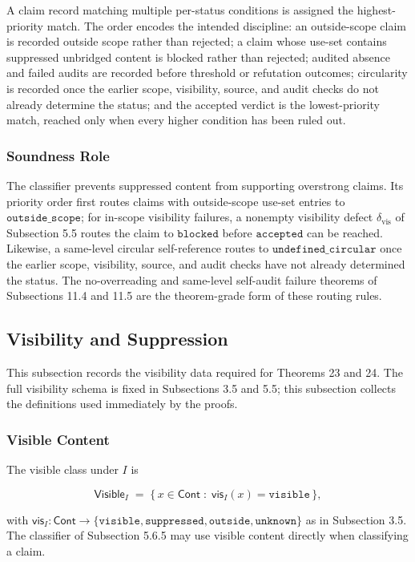 \documentclass[11pt]{article}
\theoremstyle{definition}
\begin{document}
A claim record matching multiple per-status conditions is assigned the highest-priority match. The order encodes the intended discipline: an outside-scope claim is recorded outside scope rather than rejected; a claim whose use-set contains suppressed unbridged content is blocked rather than rejected; audited absence and failed audits are recorded before threshold or refutation outcomes; circularity is recorded once the earlier scope, visibility, source, and audit checks do not already determine the status; and the accepted verdict is the lowest-priority match, reached only when every higher condition has been ruled out.

\subsubsection{Soundness Role}

The classifier prevents suppressed content from supporting overstrong claims. Its priority order first routes claims with outside-scope use-set entries to \(\texttt{outside\_scope}\); for in-scope visibility failures, a nonempty visibility defect \(\delta_{\mathrm{vis}}\) of Subsection 5.5 routes the claim to \(\texttt{blocked}\) before \(\texttt{accepted}\) can be reached. Likewise, a same-level circular self-reference routes to \(\texttt{undefined\_circular}\) once the earlier scope, visibility, source, and audit checks have not already determined the status. The no-overreading and same-level self-audit failure theorems of Subsections 11.4 and 11.5 are the theorem-grade form of these routing rules.

\subsection{Visibility and Suppression}

This subsection records the visibility data required for Theorems 23 and 24. The full visibility schema is fixed in Subsections 3.5 and 5.5; this subsection collects the definitions used immediately by the proofs.

\subsubsection{Visible Content}

The visible class under \(I\) is

\[
\mathsf{Visible}_I\;=\;\{\,x\in\mathsf{Cont}\;:\;\mathsf{vis}_I(x)=\texttt{visible}\,\},
\]

with \(\mathsf{vis}_I:\mathsf{Cont}\to\{\texttt{visible},\texttt{suppressed},\texttt{outside},\texttt{unknown}\}\) as in Subsection 3.5. The classifier of Subsection 5.6.5 may use visible content directly when classifying a claim.
\end{document}
